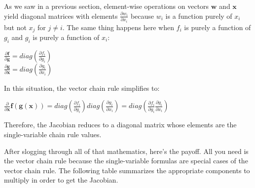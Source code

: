 \documentclass[11pt]{article}
\begin{document}
As we saw in a previous section, element-wise operations on vectors $\mathbf{w}$ and $\mathbf{x}$ yield diagonal matrices with elements $\frac{\partial w_i}{\partial x_i}$ because $w_i$ is a function purely of $x_i$ but not $x_j$ for $j \neq i$. The same thing happens here when $f_i$ is purely a function of $g_i$ and $g_i$ is purely a function of $x_i$:

$\frac{\partial \mathbf{f}}{\partial \mathbf{g}} = diag(\frac{\partial f_i}{\partial g_i})$\\
$\frac{\partial \mathbf{g}}{\partial \mathbf{x}} = diag(\frac{\partial g_i}{\partial x_i})$

In this situation, the vector chain rule simplifies to:

$\frac{\partial}{\partial \mathbf{x}} \mathbf{f}(\mathbf{g}(\mathbf{x})) = diag(\frac{\partial f_i}{\partial g_i})diag(\frac{\partial g_i}{\partial x_i}) = diag(\frac{\partial f_i}{\partial g_i}\frac{\partial g_i}{\partial x_i})$

Therefore, the Jacobian reduces to a diagonal matrix whose elements are the single-variable chain rule values.

After slogging through all of that mathematics, here's the payoff. All you need is the vector chain rule because the single-variable formulas are special cases of the vector chain rule. The following table summarizes the appropriate components to multiply in order to get the Jacobian.
\end{document}
